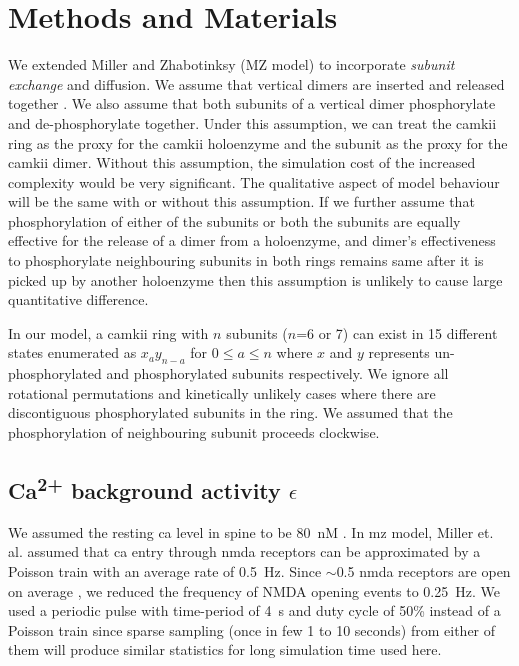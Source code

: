 \documentclass[9pt,lineno,doublespacing]{elife}
\newcommand\SUP[2]{#1\textsuperscript{#2}}
\begin{document}
\section{Methods and Materials}{\label{sec:materials_and_methods} 

We extended Miller and Zhabotinksy (MZ model) \citep{miller_stability_2005} to
incorporate \emph{subunit exchange} and diffusion. We assume that vertical
dimers are inserted and released together \citep{bhattacharyya_molecular_2016}.
We also assume that both subunits of a vertical dimer phosphorylate and
de-phosphorylate together. Under this assumption, we can treat the \gls{camkii}
ring as the proxy for the \gls{camkii} holoenzyme and the subunit as the proxy
for the \gls{camkii} dimer. Without this assumption, the simulation cost of the
increased complexity would be very significant. The qualitative aspect of model
behaviour will be the same with or without this assumption. If we further assume
that phosphorylation of either of the subunits or both the subunits are equally
effective for the release of a dimer from a holoenzyme, and dimer's
effectiveness to phosphorylate neighbouring subunits in both rings remains same
after it is picked up by another holoenzyme then this assumption is unlikely to
cause large quantitative difference. 

In our model, a \gls{camkii} ring with $n$ subunits ($n$=6 or 7) can exist
in 15 different states enumerated as $x_{a}y_{n-a}$ for $0 \le a \le n$ where
$x$ and $y$ represents un-phosphorylated and phosphorylated subunits
respectively. We ignore all rotational permutations and kinetically unlikely
cases where there are discontiguous phosphorylated subunits in the ring. We
assumed that the phosphorylation of neighbouring subunit proceeds clockwise.

\subsection{\SUP{Ca}{2+} background activity $\epsilon$}\label{subsec:calcium_background}

We assumed the resting \gls{ca} level in spine to be \SI{80}{\nano M}
\citep{berridge_neuronal_1998}. In \gls{mz} model, Miller et. al. assumed that
\gls{ca} entry through \gls{nmda} receptors can be approximated by a Poisson
train with an average rate of \SI{0.5}{Hz}.  Since $\sim$0.5 \gls{nmda}
receptors are open on average \citep{nimchinsky_number_2004}, we reduced the
frequency of NMDA opening events to \SI{0.25}{Hz}. We used a periodic pulse with
time-period of \SI{4}{\second} and duty cycle of 50\% instead of a Poisson train
since sparse sampling (once in few 1 to 10 seconds) from either of them will
produce similar statistics for long simulation time used here. 

}
\end{document}

